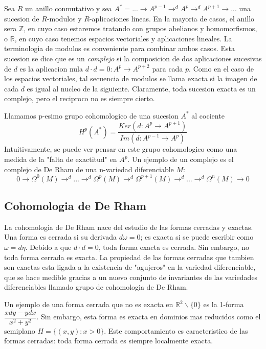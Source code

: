 \documentclass[12pt]{extarticle}
\newcommand{\R}{\mathbb{R}}
\newcommand{\Z}{\mathbb{Z}}
\newcommand{\<}{\langle}
\renewcommand{\>}{\rangle}
\theoremstyle{definition}
\begin{document}
Sea $R$ un anillo conmutativo y sea $A^* = ... \to A^{p-1} \to^d A^p \to^d A^{p+1} \to
...$ una sucesion de $R$-modulos y $R$-aplicaciones lineas. En la mayoria de
casos, el anillo sera $\Z$, en cuyo caso estaremos tratando con grupos abelianos
y homomorfismos, o $\R$, en cuyo caso tenemos espacios vectoriales y
aplicaciones lineales. La terminologia de modulos es conveniente para combinar
ambos casos. Esta sucesion se dice que es un \emph{complejo} si la composicion de dos
aplicaciones sucesivas de $d$ es la aplicacion nula $d \cdot d = 0: A^p \to
A^{p+2}$ para cada $p$. Como en el caso de los espacios vectoriales, tal
secuencia de modulos se llama exacta si la imagen de cada $d$ es igual al nucleo
de la siguiente. Claramente, toda sucesion exacta es un complejo, pero el
reciproco no es siempre cierto.

Llamamos p-esimo grupo cohomologico de una sucesion $A^*$ al cociente
\begin{equation*}
	H^p(A^*)=\dfrac{Ker(d:A^p \rightarrow A^{p+1})}{Im(d:A^{p-1}\rightarrow A^p)}
\end{equation*}
Intuitivamente, se puede ver pensar en este grupo cohomologico como una medida
de la "falta de exactitud" en $A^p$. Un ejemplo de un complejo es el complejo de
De Rham de una n-variedad diferenciable $M$:
\begin{equation*}
	0 \to \Omega^0(M)\to^d ... \to^d \Omega^p(M) \to^d \Omega^{p+1}(M) \to^d ... \to^d \Omega^n(M)\to 0
\end{equation*}

\subsection{Cohomologia de De Rham}

La cohomologia de De Rham nace del estudio de las formas cerradas y exactas. Una
forma es cerrada si su derivada $d\omega =0$; es exacta si se puede escribir
como $\omega = d\eta$. Debido a que $d \cdot d = 0$, toda forma exacta es
cerrada. Sin embargo, no toda forma cerrada es exacta. La propiedad de las formas
cerradas que tambien son exactas esta ligada a la existencia de "agujeros" en la
variedad diferenciable, que se hace medible gracias a un nuevo
conjunto de invariantes de las variedades diferenciables llamado grupo de
cohomologia de De Rham.

Un ejemplo de una forma cerrada que no es exacta en $\R^2 \backslash \{0\}$ es la
1-forma $\dfrac{xdy -ydx}{x^2+y^2}$. Sin embargo, esta forma es exacta en
dominios mas reducidos como el semiplano $H=\{(x,y):x>0\}$. Este comportamiento
es caracteristico de las formas cerradas: toda forma cerrada es siempre
localmente exacta.
\end{document}
